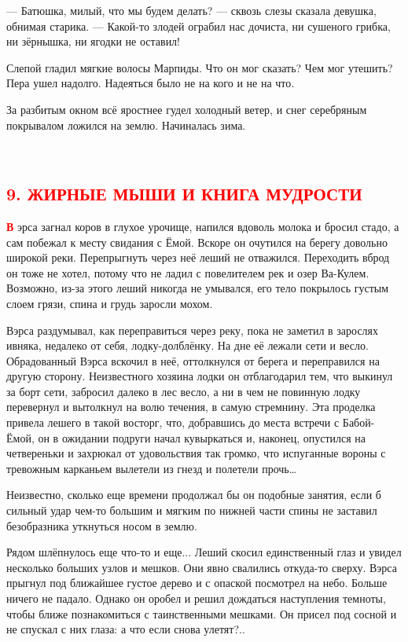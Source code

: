 \documentclass[oneside,final,14pt]{extreport}
\begin{document}
	— Батюшка, милый, что мы будем делать? — сквозь слезы сказала девушка, обнимая старика. — Какой-то злодей ограбил нас дочиста, ни сушеного грибка, ни зёрнышка, ни ягодки не оставил!
	
	Слепой гладил мягкие волосы Марпиды. Что он мог сказать? Чем мог утешить? Пера ушел надолго. Надеяться было не на кого и не на что.
	
	За разбитым окном всё яростнее гудел холодный ветер, и снег серебряным покрывалом ложился на землю. Начиналась зима.
	
			\
	{%
		\centering
		\subsection*{\textcolor{red}{9. ЖИРНЫЕ МЫШИ И КНИГА МУДРОСТИ}}
	}
	
	
	\lettrine[findent=0pt]{\textbf{\textcolor{red}{В}}}{} эрса загнал коров в глухое урочище, напился вдоволь молока и бросил стадо, а сам побежал к месту свидания с Ёмой. Вскоре он очутился на берегу довольно широкой реки. Перепрыгнуть через неё леший не отважился. Переходить вброд он тоже не хотел, потому что не ладил с повелителем рек и озер Ва-Кулем. Возможно, из-за этого леший никогда не умывался, его тело покрылось густым слоем грязи, спина и грудь заросли мохом.
	
	Вэрса раздумывал, как переправиться через реку, пока не заметил в зарослях ивняка, недалеко от себя, лодку-долблёнку. На дне её лежали сети и весло. Обрадованный Вэрса вскочил в неё, оттолкнулся от берега и переправился на другую сторону. Неизвестного хозяина лодки он отблагодарил тем, что выкинул за борт сети, забросил далеко в лес весло, а ни в чем не повинную лодку перевернул и вытолкнул на волю течения, в самую стремнину. Эта проделка привела лешего в такой восторг, что, добравшись до места встречи с Бабой-Ёмой, он в ожидании подруги начал кувыркаться и, наконец, опустился на четвереньки и захрюкал от удовольствия так громко, что испуганные вороны с тревожным карканьем вылетели из гнезд и полетели прочь…
	
	Неизвестно, сколько еще времени продолжал бы он подобные занятия, если б сильный удар чем-то большим и мягким по нижней части спины не заставил безобразника уткнуться носом в землю.
	
	Рядом шлёпнулось еще что-то и еще... Леший скосил единственный глаз и увидел несколько больших узлов и мешков. Они явно свалились откуда-то сверху. Вэрса прыгнул под ближайшее густое дерево и с опаской посмотрел на небо. Больше ничего не падало. Однако он оробел и решил дождаться наступления темноты, чтобы ближе познакомиться с таинственными мешками. Он присел под сосной и не спускал с них глаза: а что если снова улетят?..
	
\end{document}
